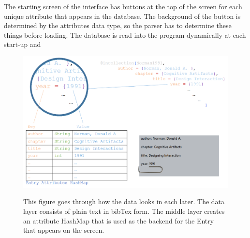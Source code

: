 \documentclass{article}
\begin{document}
The starting screen of the interface has buttons at the top of the screen for each unique attribute that appears in the database.  The background of the button is determined by the attributes data type, so the parser has to determine these things before loading.  The database is read into the program dynamically at each start-up and  

\begin{figure}[t!]
\centering
\scalebox{.5085}
{\includegraphics{bibTexToEntry.png}}
\caption{This figure goes through how the data looks in each later.  The data layer consists of plain text in bibTex form.  The middle layer creates an attribute HashMap that is used as the backend for the Entry that appears on the screen.}
\label{Fig:bibTexToEntry}
\end{figure}



%
\end{document}
